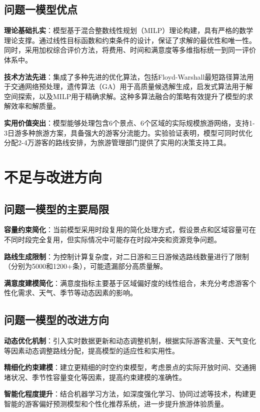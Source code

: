 \subsection[\hspace{-2pt}问题一模型优点]{{\heiti{} \hspace{-8pt}问题一模型优点}}\label{subsection5: 问题一模型优点}

\noindent\textbf{理论基础扎实}：模型基于混合整数线性规划（MILP）理论构建，具有严格的数学理论支撑。通过线性目标函数和约束条件的设计，保证了求解的最优性和唯一性。同时，采用加权综合评价方法，将费用、时间和满意度等多维指标统一到同一评价体系中。

\noindent\textbf{技术方法先进}：集成了多种先进的优化算法，包括Floyd-Warshall最短路径算法用于交通网络预处理，遗传算法（GA）用于高质量候选解生成，启发式算法用于解空间探索，以及MILP用于精确求解。这种多算法融合的策略有效提升了模型的求解效率和解质量。

\noindent\textbf{实用价值突出}：模型能够处理包含6个景点、6个区域的实际规模旅游网络，支持1-3日游多种旅游方案，具备强大的游客分流能力。实验验证表明，模型可同时优化分配2-4万游客的路线安排，为旅游管理部门提供了实用的决策支持工具。

\section[\hspace{-2pt}不足与改进方向]{{\heiti{} \hspace{-8pt}不足与改进方向}}\label{section5: 不足与改进方向}

\subsection[\hspace{-2pt}问题一模型的主要局限]{{\heiti{} \hspace{-8pt}问题一模型的主要局限}}\label{subsection5: 问题一模型局限}

\noindent\textbf{容量约束简化}：当前模型采用时段复用的简化处理方式，假设景点和区域容量可在不同时段完全复用，但实际情况中可能存在时段冲突和资源竞争问题。

\noindent\textbf{路线生成限制}：为控制计算复杂度，对二日游和三日游候选路线数量进行了限制（分别为5000和1200+条），可能遗漏部分高质量解。

\noindent\textbf{满意度建模简化}：满意度指标主要基于区域偏好度的线性组合，未充分考虑游客个性化需求、天气、季节等动态因素的影响。

\subsection[\hspace{-2pt}问题一模型的改进方向]{{\heiti{} \hspace{-8pt}问题一模型的改进方向}}\label{subsection5: 问题一模型改进}

\noindent\textbf{动态优化机制}：引入实时数据更新和动态调整机制，根据实际游客流量、天气变化等因素动态调整路线分配，提高模型的适应性和实用性。

\noindent\textbf{精细化约束建模}：建立更精细的时空约束模型，考虑景点的实际开放时间、交通拥堵状况、季节性容量变化等因素，提高约束建模的准确性。

\noindent\textbf{智能化程度提升}：结合机器学习方法，如深度强化学习、协同过滤等技术，构建更智能的游客偏好预测模型和个性化推荐系统，进一步提升旅游体验质量。

